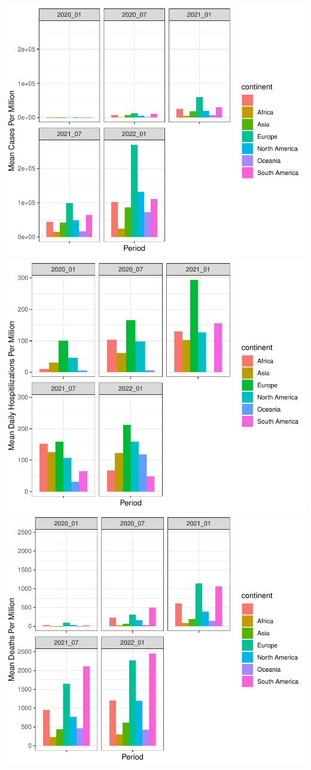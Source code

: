 \documentclass[11pt,preprint, authoryear]{elsarticle}
\numberwithin{equation}{section}
\numberwithin{figure}{section}
\numberwithin{table}{section}
\begin{document}
\includegraphics{Question_1_files/figure-latex/unnamed-chunk-3-1.pdf}
\includegraphics{Question_1_files/figure-latex/unnamed-chunk-3-2.pdf}
\includegraphics{Question_1_files/figure-latex/unnamed-chunk-3-3.pdf}
\end{document}
